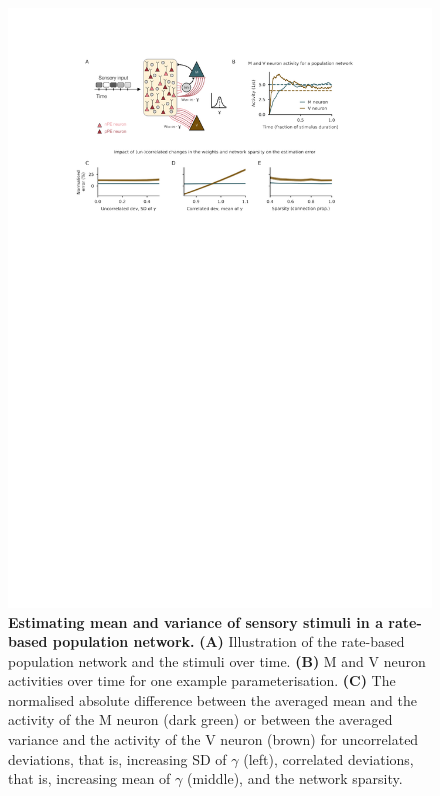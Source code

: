 \documentclass[10pt,a4paper,draft]{article}
\begin{document}
\begin{figure}[!h]
	\centering
    \includegraphics{../results/figures/final/Fig_2_S2.pdf}%
\caption{\footnotesize{\bf Estimating mean and variance of sensory stimuli in a rate-based population network.\newline}  
{\bf (A)} Illustration of the rate-based population network and the stimuli over time.
{\bf (B)} M and V neuron activities over time for one example parameterisation.
{\bf (C)} The normalised absolute difference between the averaged mean and the activity of the M neuron (dark green) or between the averaged variance and the activity of the V neuron (brown) for uncorrelated deviations, that is, increasing SD of $\gamma$ (left), correlated deviations, that is, increasing mean of $\gamma$ (middle), and the network sparsity.
}
\label{fig:Fig_2_S2}
\end{figure}
\end{document}
